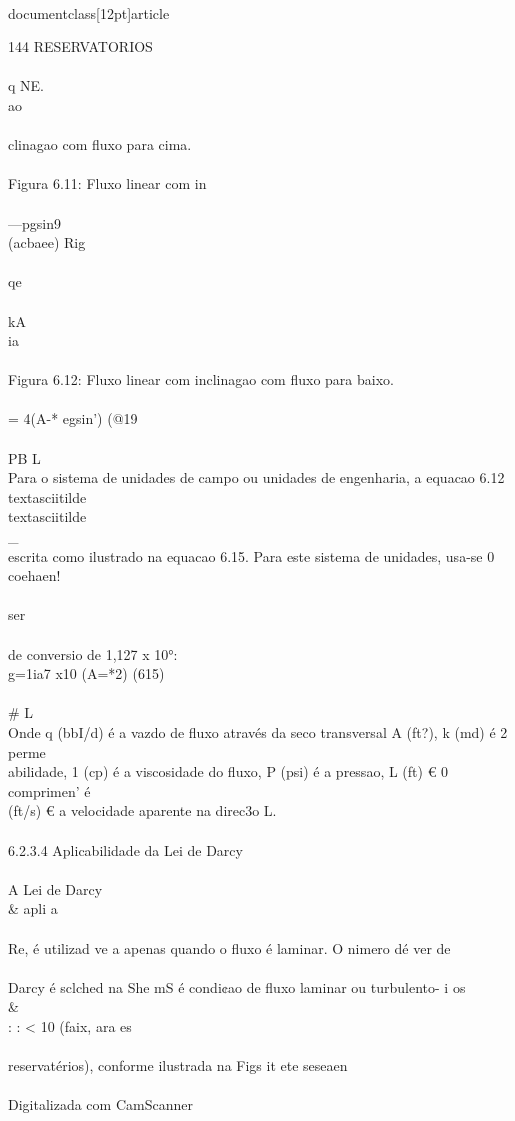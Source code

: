 \\documentclass[12pt]{article}
\begin{document}
144 RESERVATORIOS\\
\\
q NE.\\
ao\\
\\
clinagao com fluxo para cima.\\
\\
Figura 6.11: Fluxo linear com in\\
\\
—pgsin9\\
(acbaee) Rig\\
\\
qe\\
\\
kA\\
ia\\
\\
Figura 6.12: Fluxo linear com inclinagao com fluxo para baixo.\\
\\
= 4(A-* egsin’) (@19\\
\\
PB L\\
Para o sistema de unidades de campo ou unidades de engenharia, a equacao 6.12 \\textasciitilde{}\\textasciitilde{} \\_\\
escrita como ilustrado na equacao 6.15. Para este sistema de unidades, usa-se 0 coehaen!\\
\\
ser\\
\\
de conversio de 1,127 x 10°:\\
g=1ia7 x10 (A=*2) (615)\\
\\# L\\
Onde q (bbI/d) é a vazdo de fluxo através da seco transversal A (ft?), k (md) é 2 perme\\
abilidade, 1 (cp) é a viscosidade do fluxo, P (psi) é a pressao, L (ft) € 0 comprimen' é\\
(ft/s) € a velocidade aparente na direc3o L.\\
\\
6.2.3.4 Aplicabilidade da Lei de Darcy\\
\\
A Lei de Darcy \\& apli a\\
\\
Re, é utilizad ve a apenas quando o fluxo é laminar. O nimero dé ver de\\
\\
Darcy é sclched na She mS é condi¢ao de fluxo laminar ou turbulento- i os \\&\\
: : < 10 (faix, ara es\\
\\
reservatérios), conforme ilustrada na Figs it ete seseaen\\
\\
Digitalizada com CamScanner\\
\end{document}
